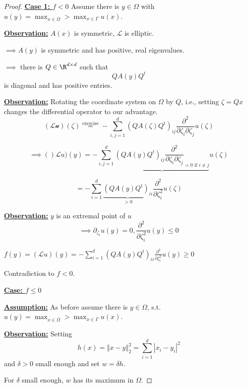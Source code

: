 \begin{proof}
    \underline{\textbf{Case 1: $f<0$}} Assume there is $y\in \Omega$ with $u(y)=\max_{x\in\overline{\Omega}}>\max_{x\in\Gamma} u(x)$.

    \underline{\textbf{Observation:}} $A(x)$ is symmetric, $\mathcal{L}$ is elliptic.

    $\implies A(y)$ is symmetric and has positive, real eigenvalues.

    $\implies $ there is $Q\in\R^{d\times d}$ such that \[QA(y)Q^t\]
    is diagonal and has positive entries.


    \underline{\textbf{Observation:}}  Rotating the coordinate system on $\Omega$ by $Q$, i.e., setting $\zeta=Qx$ changes the differential operator to our advantage.
    \[(\mathcal{Lu})(\zeta)\stackrel{\text{exercise}}{=}-\sum_{i,j=1}^d\left(QA(\zeta)Q^t\right)_{ij}\frac{\partial^2}{\partial \zeta_i\partial\zeta_j}u(\zeta)\]

    \[\implies ()\mathcal{L}u)(y)=-\sum_{i,j=1}^d\underbrace{\left(QA(y)Q^t\right)_{ij}\frac{\partial^2}{\partial \zeta_i\partial\zeta_j}_{=0\text{ if } i\neq j}}u(\zeta)\]

    \[=-\sum_{i=1}^d \underbrace{(QA(y)Q^t)_{ii}}_{>0}\frac{\partial^2}{\partial \zeta_i^2}u(\zeta)\]

    \underline{\textbf{Observation:}} $y$ is an extremal point of $u$ 
    \[\implies \partial_{\zeta_i}u(y)=0,  \frac{\partial^2}{\partial \zeta_i^2}u(y)\leq 0\]

    $f(y)=(\mathcal{L}u)(y)=-\sum_{i=1}^d\left(QA(y)Q^t\right)_{ii}\frac{\partial^2}{\partial \zeta_i^2}u(y)\geq 0$

    Contradiction to $f<0$.

    \underline{\textbf{Case: $f\leq 0$}}

    \underline{\textbf{Assumption:}} As before assume there is $y\in\Omega$, s.t. $u(y)=\max_{x\in\overline{\Omega}}>\max_{x\in\Gamma} u(x)$.

    \underline{\textbf{Observation:}} Setting \[h(x)=\left\Vert x-y \right\Vert_2^2=\sum_{i=1}^d \left\vert x_i-y_i \right\vert^2\]
    and $\delta>0$ small enough and set $w = \delta h$.
    
    For $\delta$ small enough, $w$ has its maximum in $\Omega$.

\end{proof}











